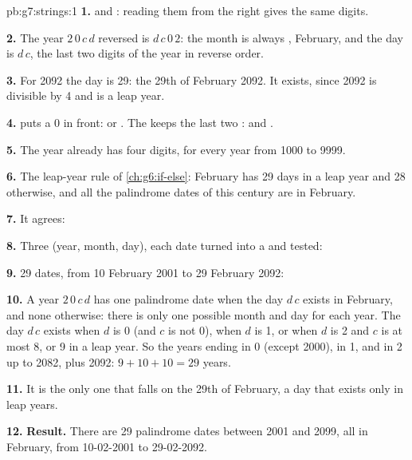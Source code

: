\begin{solution}{pb:g7:strings:1}
\textbf{1.}  and : reading them from the right
gives the same digits.

\textbf{2.} The year $2\,0\,c\,d$ reversed is $d\,c\,0\,2$: the month is always
, February, and the day is $d\,c$, the last two digits of the year in
reverse order.

\textbf{3.} For 2092 the day is 29: the 29th of February 2092. It exists, since
2092 is divisible by 4 and is a leap year.

\textbf{4.}  puts a 0 in front:  or .
The  \code{[-2:]} keeps the last two :  and
.

\textbf{5.} The year already has four digits, for every year from 1000 to
9999.

\textbf{6.} The leap-year rule of \cref{ch:g6:if-else}: February has 29 days in
a leap year and 28 otherwise, and all the palindrome dates of this century are
in February.

\textbf{7.} It agrees:

\label{out:g7:strings:dates}

\textbf{8.} Three  (year, month, day), each date turned into a
 and tested:

\label{lst:g7:strings:all-dates}

\textbf{9.} 29 dates, from 10 February 2001 to 29 February 2092:

\label{out:g7:strings:all-dates}

\textbf{10.} A year $2\,0\,c\,d$ has one palindrome date when the day $d\,c$
exists in February, and none otherwise: there is only one possible month and
day for each year. The day $d\,c$ exists when $d$ is 0 (and $c$ is not 0), when
$d$ is 1, or when $d$ is 2 and $c$ is at most 8, or 9 in a leap year. So the
years ending in 0 (except 2000), in 1, and in 2 up to 2082, plus 2092: $9 + 10 +
10 = 29$ years.

\textbf{11.} It is the only one that falls on the 29th of February, a day that
exists only in leap years.

\textbf{12.} \textbf{Result.} There are 29 palindrome dates between 2001 and
2099, all in February, from 10-02-2001 to 29-02-2092.
\end{solution}
